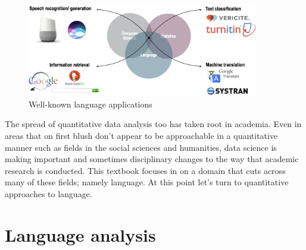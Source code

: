 \documentclass[
  letterpaper,
]{latex/krantz}
\begin{document}
\begin{figure}[h]

{\centering \includegraphics[width=0.9\textwidth,height=\textheight]{./figures/text-analysis/well-known-language-applications.png}

}

\caption{\label{fig-intro-language-applications}Well-known language
applications}

\end{figure}

The spread of quantitative data analysis too has taken root in academia.
Even in areas that on first blush don't appear to be approachable in a
quantitative manner such as fields in the social sciences and
humanities, data science is making important and sometimes disciplinary
changes to the way that academic research is conducted. This textbook
focuses in on a domain that cuts across many of these fields; namely
language. At this point let's turn to quantitative approaches to
language.

\hypertarget{language-analysis}{%
\section{Language analysis}\label{language-analysis}}
\end{document}
